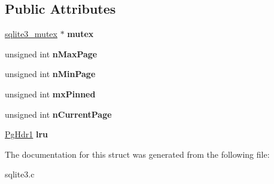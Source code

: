 \subsection*{Public Attributes}
\begin{DoxyCompactItemize}
\item 
\hyperlink{structsqlite3__mutex}{sqlite3\+\_\+mutex} $\ast$ {\bfseries mutex}\hypertarget{structPGroup_a7173aa723aa61d6b1f79cde2f7d0f74d}{}\label{structPGroup_a7173aa723aa61d6b1f79cde2f7d0f74d}

\item 
unsigned int {\bfseries n\+Max\+Page}\hypertarget{structPGroup_a219ff89d38529cbb6b47e60f41896f41}{}\label{structPGroup_a219ff89d38529cbb6b47e60f41896f41}

\item 
unsigned int {\bfseries n\+Min\+Page}\hypertarget{structPGroup_aedf84324cb7138c9f9ee31814e8274c0}{}\label{structPGroup_aedf84324cb7138c9f9ee31814e8274c0}

\item 
unsigned int {\bfseries mx\+Pinned}\hypertarget{structPGroup_ac7cdffac1c20d260e8230dba4ab05cea}{}\label{structPGroup_ac7cdffac1c20d260e8230dba4ab05cea}

\item 
unsigned int {\bfseries n\+Current\+Page}\hypertarget{structPGroup_a532a09e3e6bf7a20a934764b4bd698a5}{}\label{structPGroup_a532a09e3e6bf7a20a934764b4bd698a5}

\item 
\hyperlink{structPgHdr1}{Pg\+Hdr1} {\bfseries lru}\hypertarget{structPGroup_a73c1201996cb4750677fdf1d73f50a92}{}\label{structPGroup_a73c1201996cb4750677fdf1d73f50a92}

\end{DoxyCompactItemize}


The documentation for this struct was generated from the following file\+:\begin{DoxyCompactItemize}
\item 
sqlite3.\+c\end{DoxyCompactItemize}
